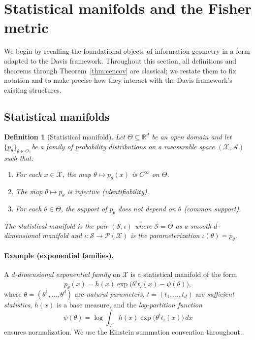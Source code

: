 \documentclass[11pt]{article}
\newcommand{\RR}{\mathbb{R}}
\newtheorem{definition}{Definition}
\theoremstyle{remark}
\begin{document}
\section{Statistical manifolds and the Fisher metric}
\label{sec:statistical-manifolds}

We begin by recalling the foundational objects of information geometry in a
form adapted to the Davis framework.  Throughout this section, all definitions
and theorems through Theorem~\ref{thm:cencov} are classical; we restate them
to fix notation and to make precise how they interact with the Davis
framework's existing structures.

\subsection{Statistical manifolds}

\begin{definition}[Statistical manifold]\label{def:stat-manifold}
Let $\Theta \subseteq \RR^d$ be an open domain and let
$\{p_\theta\}_{\theta \in \Theta}$ be a family of probability distributions on
a measurable space $(\mathcal{X}, \mathcal{A})$ such that:
\begin{enumerate}[label=\textnormal{(\roman*)}, leftmargin=*]
  \item For each $x \in \mathcal{X}$, the map $\theta \mapsto p_\theta(x)$ is
  $C^\infty$ on $\Theta$.
  \item The map $\theta \mapsto p_\theta$ is injective (identifiability).
  \item For each $\theta \in \Theta$, the support of $p_\theta$ does not depend
  on $\theta$ (common support).
\end{enumerate}
The \emph{statistical manifold} is the pair $(\mathcal{S}, \iota)$ where
$\mathcal{S} = \Theta$ as a smooth $d$-dimensional manifold and
$\iota : \mathcal{S} \to \mathcal{P}(\mathcal{X})$ is the parameterization
$\iota(\theta) = p_\theta$.
\end{definition}

\paragraph{Example (exponential families).}
A \emph{$d$-dimensional exponential family} on $\mathcal{X}$ is a statistical
manifold of the form
\begin{equation}\label{eq:exp-family}
p_\theta(x)
= h(x) \exp\!\bigl(\theta^i t_i(x) - \psi(\theta)\bigr),
\end{equation}
where $\theta = (\theta^1, \dots, \theta^d)$ are \emph{natural parameters},
$t = (t_1, \dots, t_d)$ are \emph{sufficient statistics}, $h(x)$ is a base
measure, and the \emph{log-partition function}
\begin{equation}\label{eq:log-partition}
\psi(\theta) = \log \int_{\mathcal{X}} h(x)
\exp\!\bigl(\theta^i t_i(x)\bigr)\, dx
\end{equation}
ensures normalization.  We use the Einstein summation convention throughout.
\end{document}
